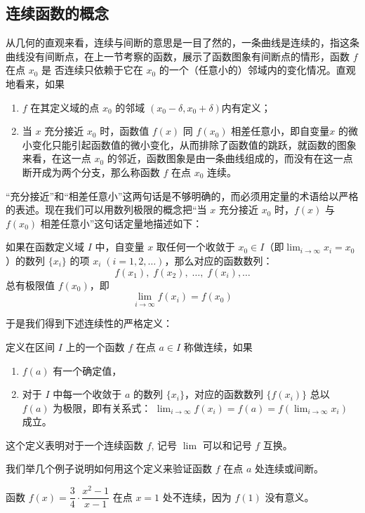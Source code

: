 \subsection{连续函数的概念}
从几何的直观来看，连续与间断的意思是一目了然的，一条曲线是连续的，指这条曲线没有间断点，在上一节考察的函数，展示了函数图象有间断点的情形，函数 $f$ 在点 $x_0$ 是
否连续只依赖于它在 $x_0$ 的一个（任意小的）邻域内的变化情况。直观地看来，如果
\begin{enumerate}
  \item $f$ 在其定义域的点 $x_0$ 的邻域 $(x_0-\delta,x_0+\delta) $内有定义；
  \item 当 $x$ 充分接近 $x_0$ 时，函数值 $f(x)$ 同 $f(x_0)$ 相差任意小，即自变量$x$ 的微小变化只能引起函数值的微小变化，从而排除了函数值的跳跃，就函数的图象来看，在这一点 $x_0$ 的邻近，函数图象是由一条曲线组成的，而没有在这一点断开成为两个分支，那么称函数 $f$ 在点 $x_0$ 连续。
\end{enumerate}

“充分接近”和“相差任意小”这两句话是不够明确的，而必须用定量的术语给以严格的表述。现在我们可以用数列极限的概念把“当 $x$ 充分接近 $x_0$ 时，$f(x)$ 与 $f(x_0)$ 相差任意小”这句话定量地描述如下：

如果在函数定义域 $I$ 中，自变量 $x$ 取任何一个收敛于 $x_0\in I$（即$\displaystyle\lim_{i\to\infty}x_i=x_0$）的数列 $\{x_i\}$ 的项 $x_i\; (i=1,2,\ldots)$，那么对应的函数数列：
\[f(x_1),\; f(x_2),\; \ldots,\;  f(x_i),\ldots\]
总有极限值 $f(x_0)$，即
\[\lim_{i\to\infty} f(x_i)=f(x_0)\]

于是我们得到下述连续性的严格定义：

\begin{Definition}
  定义在区间 $I$ 上的一个函数 $f$ 在点 $a\in I$ 称做连续，如果
\begin{enumerate}
  \item $f(a)$ 有一个确定值，
  \item 对于 $I$ 中每一个收敛于 $a$ 的数列 $\{x_i\}$，对应的函数数列 $\{f(x_i)\}$ 总以 $f(a)$ 为极限，即有关系式：
  $\displaystyle\lim_{i\to \infty}f(x_i)=f(a)=f\left(\lim_{i\to \infty}x_i\right)$
  成立。
\end{enumerate}
\end{Definition}

这个定义表明对于一个连续函数 $f$, 记号 $\lim$ 可以和记号 $f$ 互换。

我们举几个例子说明如何用这个定义来验证函数 $f$ 在点 $a$ 处连续或间断。

\begin{example}\label{exp:uncontinuous1}
  函数 $f(x)=\dfrac{3}{4}\cdot\dfrac{x^2-1}{x-1}$ 在点 $x=1$ 处不连续，因为
$f(1)$ 没有意义。
\end{example}

